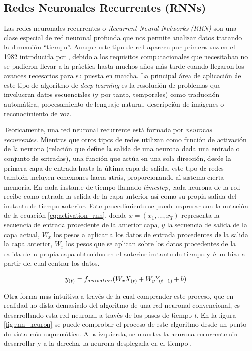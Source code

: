 \subsection{Redes Neuronales Recurrentes (RNNs)}
\label{sec:rnn}
Las redes neuronales recurrentes o \textit{Recurrent Neural Networks (RRN)} son una clase especial de red neuronal profunda que nos permite analizar datos tratando la dimensión ``tiempo''.
Aunque este tipo de red aparece por primera vez en el 1982 introducida por \cite{firstrnn}, debido a los requisitos computacionales que necesitaban no se pudieron llevar a la práctica hasta muchos años más tarde cuando llegaron los avances necesarios para su puesta en marcha. La principal área de aplicación de este tipo de algoritmo de \textit{deep learning} es la resolución de problemas que involucran datos secuenciales (y por tanto, temporales) como traducción automática, procesamiento de lenguaje natural, descripción de imágenes o reconocimiento de voz. 

Teóricamente, una red neuronal recurrente está formada por \textit{neuronas recurrentes}. Mientras que otros tipos de redes utilizan como función de activación de la neurona (relación que define la salida de una neurona dada una entrada o conjunto de entradas), una función que actúa en una sola dirección, desde la primera capa de entrada hasta la última capa de salida, este tipo de redes también incluyen conexiones hacia atrás, proporcionando al sistema cierta memoria. En cada instante de tiempo llamado \textit{timestep}, cada neurona de la red recibe como entrada la salida de la capa anterior así como su propia salida del instante de tiempo anterior. Este procedimiento se puede expresar con la notación de la ecuación \ref{eq:activation_rnn}, donde $x = (x_1,...,x_T)$ representa la secuencia de entrada procedente de la anterior capa, $y$ la secuencia de salida de la capa actual, $W_x$ los pesos a aplicar a los datos de entrada procedentes de la salida la capa anterior, $W_y$ los pesos que se aplican sobre los datos procedentes de la salida de la propia capa obtenidos en el anterior instante de tiempo y \textit{b} un bias a partir del cual centrar los datos.

\begin{equation}
	\label{eq:activation_rnn}
	\Large
	y_{(t)} = f_{activation}(W_{x}X_{(t)} + W_{y}Y_{(t-1)}+b)
\end{equation}

Otra forma más intuitiva a través de la cual comprender este proceso, que en realidad no dista demasiado del algoritmo de una red neuronal convencional, es desarrollando esta red neuronal a través de los pasos de tiempo \textit{t}. En la figura \ref{fig:rnn_neuron} se puede comprobar el proceso de este algoritmo desde un punto de vista más esquemático. A la izquierda, se muestra la neurona recurrente sin desarrollar y a la derecha, la neurona desplegada en el tiempo \citep{neuron}.

